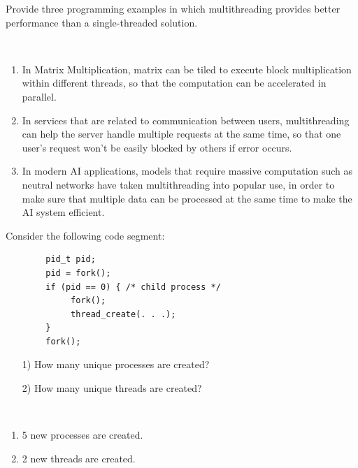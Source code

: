 \begin{exercise}[]{
    Provide three programming examples in which multithreading provides better performance than a single-threaded solution.}
  \begin{solution}
  \par{~}
  \begin{enumerate}
      \item In Matrix Multiplication, matrix can be tiled to execute block multiplication within different threads, so that the computation can be accelerated in parallel.
      \item In services that are related to communication between users, multithreading can help the server handle multiple requests at the same time, so that one user's request won't be easily blocked by others if error occurs.
      \item In modern AI applications, models that require massive computation such as neutral networks have taken multithreading into popular use, in order to make sure that multiple data can be processed at the same time to make the AI system efficient.
  \end{enumerate}
  \end{solution}
  \label{ex1}
\end{exercise}

\begin{exercise}[]{Consider the following code segment:
    \begin{verbatim}
        pid_t pid;
        pid = fork();
        if (pid == 0) { /* child process */
             fork();
             thread_create(. . .);
        }
        fork();
    \end{verbatim}
    \begin{enumerate}
        \item [1)]
        How many unique processes are created?
        \item [2)]
        How many unique threads are created?
    \end{enumerate}
    }
  \begin{solution}
  \par{~}
  \begin{enumerate}
      \item 5 new processes are created.
      \item 2 new threads are created.
  \end{enumerate}
  \end{solution}
  \label{ex2}
\end{exercise}




